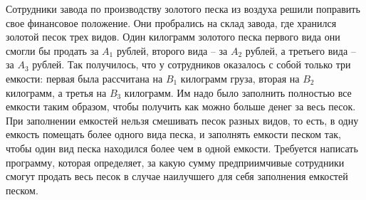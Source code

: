 Сотрудники завода по производству золотого песка из воздуха решили поправить свое финансовое положение. Они пробрались на склад завода, где хранился золотой песок трех видов. Один килограмм золотого песка первого вида они смогли бы продать за $A_1$ рублей, второго вида -- за $A_2$ рублей, а третьего вида -- за $A_3$ рублей. Так получилось, что у сотрудников оказалось с собой только три емкости: первая была рассчитана на $B_1$ килограмм груза, вторая на $B_2$ килограмм, а третья на $B_3$ килограмм. Им надо было заполнить полностью все емкости таким образом, чтобы получить как можно больше денег за весь песок. При заполнении емкостей нельзя смешивать песок разных видов, то есть, в одну емкость помещать более одного вида песка, и заполнять емкости песком так, чтобы один вид песка находился более чем в одной емкости.
Требуется написать программу, которая определяет, за какую сумму предприимчивые сотрудники смогут продать весь песок в случае наилучшего для себя заполнения емкостей песком.